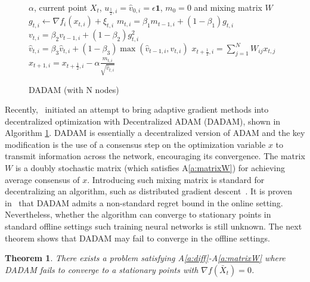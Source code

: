 \documentclass{article} %
\newtheorem{theorem}{Theorem}
\begin{document}
\begin{figure}
\vspace{-0.5in}
\begin{minipage}{\linewidth}
\begin{algorithm}[H]
	\caption{DADAM (with N nodes)}
	\label{alg: dadam}
	\begin{algorithmic}[1]
		 $\alpha$, current point $X_t$, $u_{\frac{1}{2},i} = \hat v_{0,i} = \epsilon \mathbf{1}$, $m_0=0$ and mixing matrix $W$
		\STATE  $g_{t,i}  \leftarrow \nabla f_i(x_{t,i}) + \xi_{t,i}$
		\STATE $m_{t,i} = \beta_1 m_{t-1,i} + (1-\beta_1) g_{t,i}$ 
		\STATE $v_{t,i} = \beta_2 v_{t-1,i}+(1-\beta_2)g_{t,i}^2$
		\STATE $\hat v_{t,i} = \beta_3 \hat v_{t,i} + (1-\beta_3) \max(\hat v_{t-1,i},v_{t,i})$
		\STATE $x_{t+\frac{1}{2},i} = \sum_{j=1}^N W_{ij}x_{t,j}$
		\STATE $x_{t+1,i} = x_{t+\frac{1}{2},i} - \alpha \frac{m_{t,i}}{\sqrt{\hat v_{t,i}}}$
		\ENDFAP
		\ENDFOR
	\end{algorithmic}
\end{algorithm}
\end{minipage}%
\end{figure}
Recently,~\citet{nazari2019dadam} initiated an attempt to bring adaptive gradient methods into decentralized optimization with Decentralized ADAM (DADAM), shown in Algorithm \ref{alg: dadam}.
DADAM is essentially a decentralized version of ADAM and the key modification is the use of a consensus step on the optimization variable $x$ to transmit information across the network, encouraging its convergence. The matrix $W$ is a doubly stochastic matrix (which satisfies A\ref{a:matrixW}) for achieving  average consensus of $x$. 
Introducing such mixing matrix is standard for decentralizing an algorithm, such as distributed gradient descent~\citep{nedic2009distributed, yuan2016convergence}. 
It is proven in~\citet{nazari2019dadam} that DADAM admits a non-standard regret bound in the online setting. Nevertheless, whether the algorithm can converge to stationary points in standard offline settings such training neural networks is still unknown.
The next theorem shows that DADAM may fail to converge in the offline  settings.

\begin{theorem}\label{thm: dadam_diverge}
There exists a problem satisfying A\ref{a:diff}-A\ref{a:matrixW} where DADAM fails to converge to a stationary points with $\nabla f(\bar X_t) = 0$.   
\end{theorem}
\end{document}

